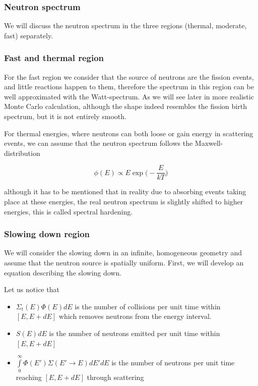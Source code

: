 \subsubsection{Neutron spectrum}

We will discuss the neutron spectrum in the three regions (thermal, moderate, fast) separately.

\subsubsection*{Fast and thermal region}

For the fast region we consider that the source of neutrons are the fission events, and little reactions happen to them, therefore the spectrum in this region can be well approximated with the Watt-spectrum. As we will see later in more realistic Monte Carlo calculation, although the shape indeed resembles the fission birth spectrum, but it is not entirely smooth.

For thermal energies, where neutrons can both loose or gain energy in scattering events, we can assume that the neutron spectrum follows the Maxwell-distribution

$$\phi(E)\propto E\exp\big(-\frac{E}{kT}\big)$$

\noindent although it has to be mentioned that in reality due to absorbing events taking place at these energies, the real neutron spectrum is slightly shifted to higher energies, this is called spectral hardening.

\subsubsection*{Slowing down region}

We will consider the slowing down in an infinite, homogeneous geometry and assume that the neutron source is spatially uniform. First, we will develop an equation describing the slowing down.

Let us notice that 

\begin{itemize}
\item $\Sigma_t(E)\Phi(E)dE$ is the number of collisions per unit time within $[E,E+dE]$ which removes neutrons from the energy interval.
\item $S(E)dE$ is the number of neutrons emitted per unit time within $[E,E+dE]$
\item $\int\limits_0^\infty \Phi(E')\Sigma(E'\rightarrow E)dE'dE$ is the number of neutrons per unit time reaching $[E,E+dE]$ through scattering
\end{itemize}

